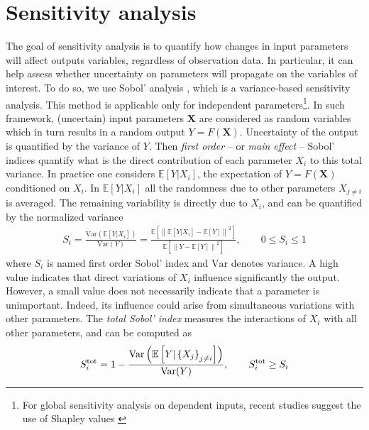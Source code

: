 \documentclass[draft]{agujournal2019}
\newcommand{\sbra}[1]{\ensuremath{\left[#1\right]}} %
\newcommand{\pbra}[1]{\ensuremath{\left\{#1\right\}}} %
\newcommand{\parenthese}[1]{\ensuremath{\left(#1\right)}} %
\newcommand{\norm}[1]{\left\lVert #1 \right\rVert} %
\begin{document}
\section{Sensitivity analysis}\label{sec: sobol}
%
The goal of sensitivity analysis is to quantify how changes in input parameters will affect outputs variables, regardless of observation data. In particular, it can help assess whether uncertainty on parameters will propagate on the variables of interest. To do so, we use Sobol' analysis \cite{sobol_sensitivity_1993}, which is a variance-based sensitivity analysis. This method is applicable only for independent parameters\footnote{For global sensitivity analysis on dependent inputs, recent studies suggest the use of Shapley values \cite{owen_sobol_2014,owen_shapley_2017}}.
In such framework, (uncertain) input parameters $\bm X$ are considered as random variables which in turn results in a random output $Y = F(\bm X)$. Uncertainty of the output is quantified by the variance of $Y$. Then \textit{first order} -- or \textit{main effect} -- Sobol' indices quantify what is the direct contribution of each parameter $X_i$ to this total variance. In practice one considers $\mathbb{E}\sbra{Y | X_i}$, the expectation of $Y = F(\bm X)$ conditioned on $X_i$. In $\mathbb{E}\sbra{Y | X_i}$ all the randomness due to other parameters $X_{j\neq i}$ is averaged. The remaining variability is directly due to $X_i$, and can be quantified by the normalized variance 
%
\begin{eqnarray}\label{eq: 1st sobol}
    S_i = \frac{\textrm{Var} \parenthese{\mathbb{E} \sbra{Y | X_i }}}{\textrm{Var}(Y)} = \frac{\mathbb{E} \sbra{\norm{ \mathbb{E} \sbra{Y | X_i} - \mathbb{E} \sbra{Y} }^2}} {\mathbb{E}  \sbra{\norm{ Y - \mathbb{E}\sbra{Y} }^2}}, \qquad 0 \leq S_i \leq 1
\end{eqnarray}
%
where $S_i$ is named first order Sobol' index and $\textrm{Var}$ denotes variance. 
%
A high value indicates that direct variations of $X_i$ influence significantly the output. However, a small value does not necessarily indicate that a parameter is unimportant. Indeed, its influence could arise from simultaneous variations with other parameters. The \textit{total Sobol' index} measures the interactions of $X_i$ with all other parameters, and can be computed as 
%
\begin{eqnarray*}
    S_i^{\rm tot} = 1 - \frac{\textrm{Var} \parenthese{\mathbb{E} \sbra{Y | \pbra{ X_j}_{j \neq i} }}}{\textrm{Var}(Y)}, \qquad   S_i^{\rm tot} \geq S_i
\end{eqnarray*}  
\end{document}
